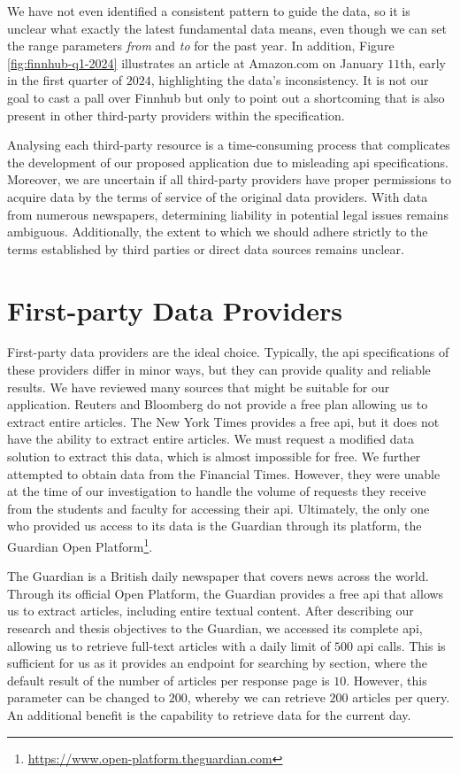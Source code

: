 We have not even identified a consistent pattern to guide the data, so it is unclear what exactly the latest fundamental data means, even though we can set the range parameters \textit{from} and \textit{to} for the past year. In addition, Figure \ref{fig:finnhub-q1-2024} illustrates an article at Amazon.com on January $11$th, early in the first quarter of $2024$, highlighting the data's inconsistency. It is not our goal to cast a pall over Finnhub but only to point out a shortcoming that is also present in other third-party providers within the specification.

Analysing each third-party resource is a time-consuming process that complicates the development of our proposed application due to misleading \acrshort{api} specifications. Moreover, we are uncertain if all third-party providers have proper permissions to acquire data by the terms of service of the original data providers. With data from numerous newspapers, determining liability in potential legal issues remains ambiguous. Additionally, the extent to which we should adhere strictly to the terms established by third parties or direct data sources remains unclear.

\section{First-party Data Providers}
\label{sec:textual-data-first-party-data-providers}
First-party data providers are the ideal choice. Typically, the \acrshort{api} specifications of these providers differ in minor ways, but they can provide quality and reliable results. We have reviewed many sources that might be suitable for our application. Reuters and Bloomberg do not provide a free plan allowing us to extract entire articles. The New York Times provides a free \acrshort{api}, but it does not have the ability to extract entire articles. We must request a modified data solution to extract this data, which is almost impossible for free. We further attempted to obtain data from the Financial Times. However, they were unable at the time of our investigation to handle the volume of requests they receive from the students and faculty for accessing their \acrshort{api}. Ultimately, the only one who provided us access to its data is the Guardian through its platform, the Guardian Open Platform\footnote{\href{https://www.open-platform.theguardian.com}{https://www.open-platform.theguardian.com}}.

The Guardian is a British daily newspaper that covers news across the world. Through its official Open Platform, the Guardian provides a free \acrshort{api} that allows us to extract articles, including entire textual content. After describing our research and thesis objectives to the Guardian, we accessed its complete \acrshort{api}, allowing us to retrieve full-text articles with a daily limit of $500$ \acrshort{api}  calls. This is sufficient for us as it provides an endpoint for searching by section, where the default result of the number of articles per response page is $10$. However, this parameter can be changed to $200$, whereby we can retrieve $200$ articles per query. An additional benefit is the capability to retrieve data for the current day.

